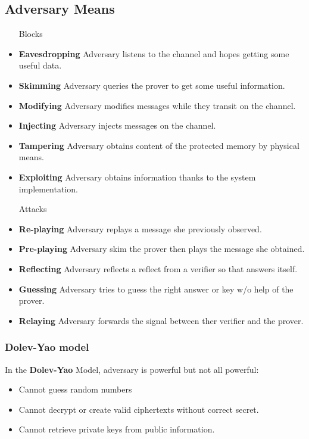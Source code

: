 \subsection{Adversary Means}
\begin{itemize}
    \item[Blocks]
\item\textbf{Eavesdropping} Adversary listens to the channel and hopes getting some
        useful data.
    \item\textbf{Skimming} Adversary queries the prover to get some useful information.
    \item\textbf{Modifying} Adversary modifies messages while they transit on the
        channel.
    \item\textbf{Injecting} Adversary injects messages on the channel.
    \item\textbf{Tampering} Adversary obtains content of the protected memory by
        physical means.
    \item\textbf{Exploiting} Adversary obtains information thanks to the system
        implementation.

    \item[Attacks]
    \item\textbf{Re-playing} Adversary replays a message she previously observed.
    \item\textbf{Pre-playing} Adversary skim the prover then plays the message she obtained.
    \item\textbf{Reflecting} Adversary reflects a reflect from a verifier so that
        answers itself.
    \item\textbf{Guessing} Adversary tries to guess the right answer or key w/o help of
        the prover.
    \item\textbf{Relaying} Adversary forwards the signal between ther verifier and the
        prover.
\end{itemize}

\subsubsection{Dolev-Yao model}
In the \textbf{Dolev-Yao} Model, adversary
is powerful but not all powerful: 
\begin{itemize}
    \item Cannot guess random numbers
    \item Cannot decrypt or create valid ciphertexts without correct secret.
    \item Cannot retrieve private keys from public information.
\end{itemize}

